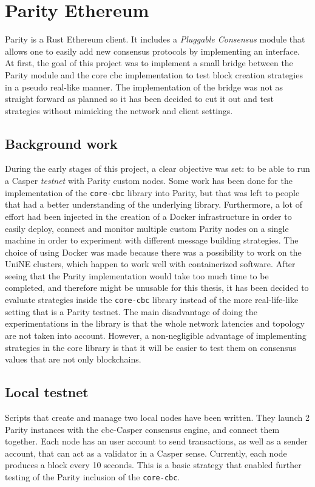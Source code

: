 \section{Parity Ethereum}
Parity is a Rust Ethereum client. It includes a \textit{Pluggable Consensus}
module that allows one to easily add new consensus protocols by implementing an
interface.  At first, the goal of this project was to implement a small bridge
between the Parity module and the core cbc implementation to test block creation
strategies in a pseudo real-like manner. The implementation of the bridge was
not as straight forward as planned so it has been decided to cut it out and test
strategies without mimicking the network and client settings.

\subsection{Background work}
During the early stages of this project, a clear objective was set: to be able
to run a Casper \textit{testnet} with Parity custom nodes. Some work has been
done for the implementation of the \texttt{core-cbc} library into Parity, but
that was left to people that had a better understanding of the underlying
library. Furthermore,  a lot of effort had been
injected in the creation of a Docker infrastructure in order to easily deploy,
connect and monitor multiple custom Parity nodes on a single machine in order to
experiment with different message building strategies. The choice of using
Docker was made because there was a  possibility to work on the UniNE clusters,
which happen to work well with containerized software. After seeing that the
Parity implementation would take too much time to be completed, and therefore
might be unusable for this thesis, it has been decided to evaluate strategies
inside the \texttt{core-cbc} library instead of the more real-life-like setting
that is a Parity testnet. The main disadvantage of doing the experimentations in
the library is that the whole network latencies and topology are not taken into
account. However, a non-negligible advantage of implementing strategies in the
core library is that it will be easier to test them on consensus values that are
not only blockchains.  

\subsection{Local testnet}
Scripts that create and manage two local nodes have been written. They launch 2
Parity instances with the \gls{cbc}-Casper consensus engine, and connect them
together. Each node has an user account to send transactions, as well as a
sender account, that can act as a validator in a Casper sense. Currently, each
node produces a block every 10 seconds. This is a basic strategy that enabled
further testing of the Parity inclusion of the \texttt{core-cbc}.

